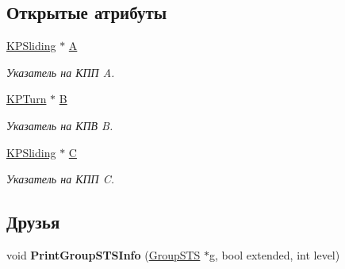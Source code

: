 \subsection*{Открытые атрибуты}
\begin{DoxyCompactItemize}
\item 
\hypertarget{class_group_s_t_s_a9fca24e6b756bfcf5f89351f5f773c15}{
\hyperlink{class_k_p_sliding}{KPSliding} $\ast$ \hyperlink{class_group_s_t_s_a9fca24e6b756bfcf5f89351f5f773c15}{A}}
\label{class_group_s_t_s_a9fca24e6b756bfcf5f89351f5f773c15}

\begin{DoxyCompactList}\small\item\em Указатель на КПП A. \item\end{DoxyCompactList}\item 
\hypertarget{class_group_s_t_s_a2dc3f5e2348367bca952de3d46891d5b}{
\hyperlink{class_k_p_turn}{KPTurn} $\ast$ \hyperlink{class_group_s_t_s_a2dc3f5e2348367bca952de3d46891d5b}{B}}
\label{class_group_s_t_s_a2dc3f5e2348367bca952de3d46891d5b}

\begin{DoxyCompactList}\small\item\em Указатель на КПВ B. \item\end{DoxyCompactList}\item 
\hypertarget{class_group_s_t_s_a422c0420100ecbef2e48fef8e5885d95}{
\hyperlink{class_k_p_sliding}{KPSliding} $\ast$ \hyperlink{class_group_s_t_s_a422c0420100ecbef2e48fef8e5885d95}{C}}
\label{class_group_s_t_s_a422c0420100ecbef2e48fef8e5885d95}

\begin{DoxyCompactList}\small\item\em Указатель на КПП C. \item\end{DoxyCompactList}\end{DoxyCompactItemize}
\subsection*{Друзья}
\begin{DoxyCompactItemize}
\item 
\hypertarget{class_group_s_t_s_a61c1e20b38cab2bbbd4931e9aec0cb55}{
void {\bfseries PrintGroupSTSInfo} (\hyperlink{class_group_s_t_s}{GroupSTS} $\ast$g, bool extended, int level)}
\label{class_group_s_t_s_a61c1e20b38cab2bbbd4931e9aec0cb55}

\end{DoxyCompactItemize}


